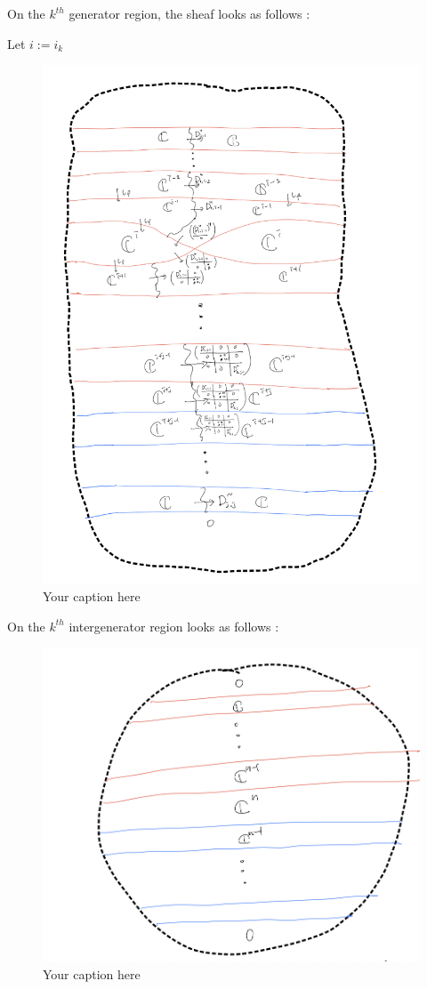 On the $k^{th}$ generator region, the sheaf looks as follows :

Let $i:=i_k$
\begin{figure}[H] %
    \centering
    \includegraphics[width=\linewidth]{diagrams/theorem15/6.png} %
    \caption{Your caption here}
    \label{fig:your-label}
\end{figure}

On the $k^{th}$ intergenerator region looks as follows :

\begin{figure}[H] %
    \centering
    \includegraphics[width=\linewidth]{diagrams/theorem15/7.png} %
    \caption{Your caption here}
    \label{fig:your-label}
\end{figure}